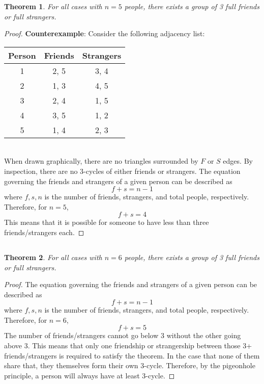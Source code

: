 \documentclass{article}
\newtheorem{theorem}{Theorem}
\begin{document}
\begin{theorem}
    For all cases with \(n = 5\) people, there exists a group of 3 full friends or full strangers.
\end{theorem}
\begin{proof}
    \textbf{Counterexample}: Consider the following adjacency list: \\
    \begin{tabular}{c|c|c}
        Person & Friends & Strangers \\
        \hline
        1 & 2, 5 & 3, 4 \\
        2 & 1, 3 & 4, 5 \\
        3 & 2, 4 & 1, 5 \\
        4 & 3, 5 & 1, 2 \\
        5 & 1, 4 & 2, 3
    \end{tabular} \\
    When drawn graphically, there are no triangles surrounded by \(F\) or \(S\) edges.
    By inspection, there are no 3-cycles of either friends or strangers.
    The equation governing the friends and strangers of a given person can be described as
    \begin{equation}
        f + s = n - 1
    \end{equation}
    where \(f, s, n\) is the number of friends, strangers, and total people, respectively.
    Therefore, for \(n = 5\),
    \begin{equation}
        f + s = 4
    \end{equation}
    This means that it is possible for someone to have less than three friends/strangers each.
\end{proof}

\subsection{}

\begin{theorem}
    For all cases with \(n = 6\) people, there exists a group of 3 full friends or full strangers.
\end{theorem}
\begin{proof}
    The equation governing the friends and strangers of a given person can be described as
    \begin{equation}
        f + s = n - 1
    \end{equation}
    where \(f, s, n\) is the number of friends, strangers, and total people, respectively.
    Therefore, for \(n = 6\),
    \begin{equation}
        f + s = 5
    \end{equation}
    The number of friends/strangers cannot go below 3 without the other going above 3.
    This means that only one friendship or strangership between those 3+ friends/strangers is required to satisfy the theorem.
    In the case that none of them share that, they themselves form their own 3-cycle.
    Therefore, by the pigeonhole principle, a person will always have at least 3-cycle.
\end{proof}
\end{document}

